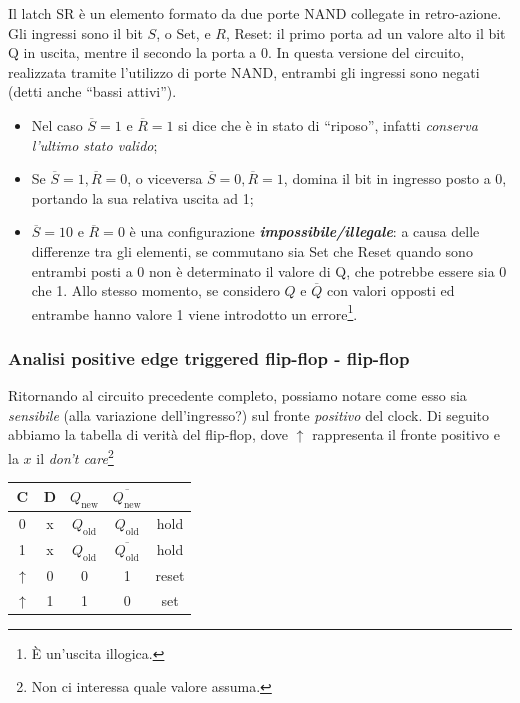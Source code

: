 \documentclass[
]{book}
\providecommand{\tightlist}{%
  \setlength{\itemsep}{0pt}\setlength{\parskip}{0pt}}
\begin{document}
Il latch SR è un elemento formato da due porte NAND collegate in
retro-azione. Gli ingressi sono il bit \(S\), o Set, e \(R\), Reset: il
primo porta ad un valore alto il bit Q in uscita, mentre il secondo la
porta a 0. In questa versione del circuito, realizzata tramite
l'utilizzo di porte NAND, entrambi gli ingressi sono negati (detti anche
``bassi attivi'').

\begin{itemize}
\tightlist
\item
  Nel caso \(\overline{S}=1\) e \(\overline{R}=1\) si dice che è in
  stato di ``riposo'', infatti \emph{conserva l'ultimo stato valido};
\item
  Se \(\overline{S}=1, \overline{R}=0\), o viceversa
  \(\overline{S}=0, \overline{R}=1\), domina il bit in ingresso posto a
  0, portando la sua relativa uscita ad 1;
\item
  \(\overline{S}=10\) e \(\overline{R}=0\) è una configurazione
  \textbf{\emph{impossibile/illegale}}: a causa delle differenze tra gli
  elementi, se commutano sia Set che Reset quando sono entrambi posti a
  0 non è determinato il valore di Q, che potrebbe essere sia 0 che 1.
  Allo stesso momento, se considero \(Q\) e \(\overline{Q}\) con valori
  opposti ed entrambe hanno valore 1 viene introdotto un
  errore\footnote{È un'uscita illogica.}.
\end{itemize}

\subsubsection{Analisi positive edge triggered flip-flop -
flip-flop}\label{analisi-positive-edge-triggered-flip-flop---flip-flop}

Ritornando al circuito precedente completo, possiamo notare come esso
sia \emph{sensibile} (alla variazione dell'ingresso?) sul fronte
\emph{positivo} del clock. Di seguito abbiamo la tabella di verità del
flip-flop, dove \(\uparrow\) rappresenta il fronte positivo e la \(x\)
il \emph{don't care}\footnote{Non ci interessa quale valore assuma.}

\begin{tabular}{ccccc}
C & D & $Q_\text{new}$ & $\overline{Q_\text{new}}$ &  \\
\hline
0 & x & $Q_\text{old}$ & $Q_\text{old}$ & hold \\
1 & x & $Q_\text{old}$ & $\overline{Q_\text{old}}$ & hold \\
$\uparrow$ & 0 & 0 & 1 & reset \\
$\uparrow$ & 1 & 1 & 0 & set
\end{tabular}
\end{document}
